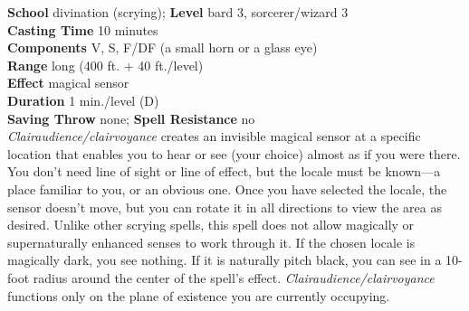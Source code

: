 \textbf{School} divination (scrying); \textbf{Level} bard 3, sorcerer/wizard 3\\
\textbf{Casting Time} 10 minutes\\
\textbf{Components} V, S, F/DF (a small horn or a glass eye)\\
\textbf{Range} long (400 ft. + 40 ft./level)\\
\textbf{Effect }magical sensor\\
\textbf{Duration} 1 min./level (D)\\
\textbf{Saving Throw} none; \textbf{Spell Resistance} no\\
\textit{Clairaudience/clairvoyance }creates an invisible magical sensor at a specific location that enables you to hear or see (your choice) almost as if you were there. You don't need line of sight or line of effect, but the locale must be known—a place familiar to you, or an obvious one. Once you have selected the locale, the sensor doesn't move, but you can rotate it in all directions to view the area as desired. Unlike other scrying spells, this spell does not allow magically or supernaturally enhanced senses to work through it. If the chosen locale is magically dark, you see nothing. If it is naturally pitch black, you can see in a 10-foot radius around the center of the spell's effect. \textit{Clairaudience/clairvoyance }functions only on the plane of existence you are currently occupying.\\
